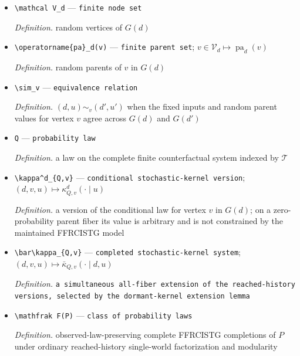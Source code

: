 \documentclass{article}
\begin{document}
\begin{itemize}
  \par\smallskip\noindent\emph{Definition.} the node-split graph induced by fixing regime \(d\) on \(\mathcal T\)
  \item \texttt{\textbackslash{}\allowbreak{}mathcal V\_\allowbreak{}d} --- \texttt{finite node set}
  \par\smallskip\noindent\emph{Definition.} random vertices of \(G(d)\)
  \item \texttt{\textbackslash{}\allowbreak{}operatorname\{pa\}\allowbreak{}\_\allowbreak{}d(v)} --- \texttt{finite parent set}; \(v\in\mathcal V_d\mapsto\operatorname{pa}_d(v)\)
  \par\smallskip\noindent\emph{Definition.} random parents of \(v\) in \(G(d)\)
  \item \texttt{\textbackslash{}\allowbreak{}sim\_\allowbreak{}v} --- \texttt{equivalence relation}
  \par\smallskip\noindent\emph{Definition.} \((d,u)\sim_v(d',u')\) when the fixed inputs and random parent values for vertex \(v\) agree across \(G(d)\) and \(G(d')\)
  \item \texttt{Q} --- \texttt{probability law}
  \par\smallskip\noindent\emph{Definition.} a law on the complete finite counterfactual system indexed by \(\mathcal T\)
  \item \texttt{\textbackslash{}\allowbreak{}kappa\textasciicircum{}d\_\allowbreak{}\{Q,\allowbreak{}v\}\allowbreak{}} --- \texttt{conditional stochastic-\allowbreak{}kernel version}; \((d,v,u)\mapsto\kappa^d_{Q,v}(\cdot\mid u)\)
  \par\smallskip\noindent\emph{Definition.} a version of the conditional law for vertex \(v\) in \(G(d)\); on a zero-probability parent fiber its value is arbitrary and is not constrained by the maintained FFRCISTG model
  \item \texttt{\textbackslash{}\allowbreak{}bar\textbackslash{}\allowbreak{}kappa\_\allowbreak{}\{Q,\allowbreak{}v\}\allowbreak{}} --- \texttt{completed stochastic-\allowbreak{}kernel system}; \((d,v,u)\mapsto\bar\kappa_{Q,v}(\cdot\mid d,u)\)
  \par\smallskip\noindent\emph{Definition.} \texttt{a simultaneous all-\allowbreak{}fiber extension of the reached-\allowbreak{}history versions,\allowbreak{} selected by the dormant-\allowbreak{}kernel extension lemma}
  \item \texttt{\textbackslash{}\allowbreak{}mathfrak F(P)} --- \texttt{class of probability laws}
  \par\smallskip\noindent\emph{Definition.} observed-law-preserving complete FFRCISTG completions of \(P\) under ordinary reached-history single-world factorization and modularity

\end{itemize}
\end{document}
